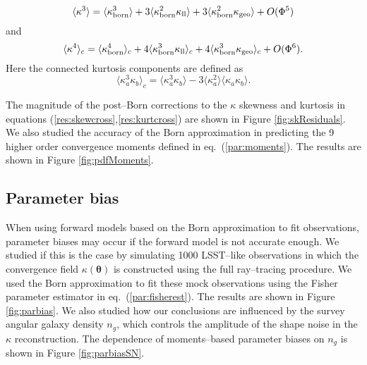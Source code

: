 \documentclass[reprint,aps,prd,superscriptaddress,showkeys,showpacs]{revtex4-1}
\newcommand\pt{\pmb{\theta}}
\begin{document}
\begin{equation}
\label{res:skewcross}
\langle\kappa^3\rangle = \langle\kappa_{\rm born}^3\rangle + 3\langle\kappa_{\rm born}^2\kappa_{\rm ll}\rangle + 3\langle\kappa_{\rm born}^2\kappa_{\rm geo}\rangle + O(\Phi^5)
\end{equation}
and
\begin{equation}
\label{res:kurtcross}
\langle\kappa^4\rangle_c = \langle\kappa_{\rm born}^4\rangle_c + 4\langle\kappa_{\rm born}^3\kappa_{\rm ll}\rangle_c + 4\langle\kappa_{\rm born}^3\kappa_{\rm geo}\rangle_c + O(\Phi^6).
\end{equation}
%
Here the connected kurtosis components are defined as 
\begin{equation}
\label{res:kurtconnected}
\langle\kappa^3_a\kappa_b\rangle_c = \langle\kappa^3_a\kappa_b\rangle - 3\langle\kappa_a^2\rangle\langle\kappa_a\kappa_b\rangle.
\end{equation}

The magnitude of the post--Born corrections to the $\kappa$ skewness and kurtosis in equations (\ref{res:skewcross},\ref{res:kurtcross}) are shown in Figure \ref{fig:skResiduals}.
We also studied the accuracy of the Born approximation in predicting the 9 higher order convergence moments defined in eq.~(\ref{par:moments}). The results are shown in Figure \ref{fig:pdfMoments}.

\subsection{Parameter bias}
When using forward models based on the Born approximation to fit observations, parameter biases may occur if the forward model is not accurate enough. We studied if this is the case by simulating 1000 LSST--like observations in which the convergence field $\kappa(\pt)$ is constructed using the full ray--tracing procedure. We used the Born approximation to fit these mock observations using the Fisher parameter estimator in eq.~(\ref{par:fisherest}). The results are shown in Figure \ref{fig:parbias}. We also studied how our conclusions are influenced by the survey angular galaxy density $n_g$, which controls the amplitude of the shape noise in the $\kappa$ reconstruction. The dependence of moments--based parameter biases on $n_g$ is shown in Figure \ref{fig:parbiasSN}.   

\end{document}
